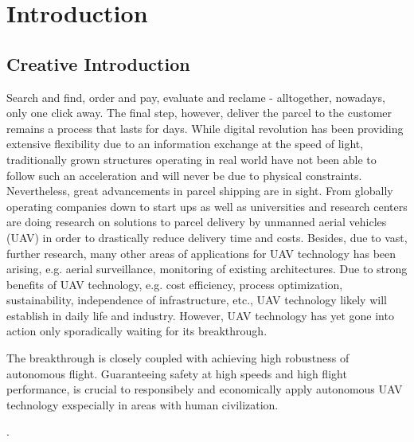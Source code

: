 
\chapter{Introduction} %

\label{Chapter1} %


\section{Creative Introduction}

Search and find, order and pay, evaluate and reclame - 
alltogether, nowadays, only one click away.
The final step, however, deliver the parcel to 
the customer remains a process that lasts for days.
While digital revolution has been providing
extensive flexibility due to an
information exchange at the speed of light,
traditionally grown structures operating in real world
have not been able to follow such an acceleration
and will never be due to physical constraints.
Nevertheless,
great advancements in parcel shipping are in sight.
From globally operating companies down to start ups as well as
universities and research centers are 
doing research on solutions to 
parcel delivery by unmanned aerial vehicles (UAV)
in order to drastically reduce delivery time and costs.
Besides, due to vast, further research,
many other areas of applications for UAV technology
has been arising, e.g. aerial surveillance, monitoring of existing architectures.
Due to strong benefits of UAV technology,
e.g. cost efficiency, process optimization, sustainability,
independence of infrastructure, etc.,
UAV technology likely will establish in daily life
and industry.
However,
UAV technology has yet gone into action only sporadically
waiting for its breakthrough.

The breakthrough is closely coupled with
achieving high robustness of autonomous flight.
Guaranteeing safety at high speeds and high flight performance,
is crucial to
responsibely and economically apply autonomous UAV technology
exspecially in areas with human civilization.

\cite{loquercio2018learning}.